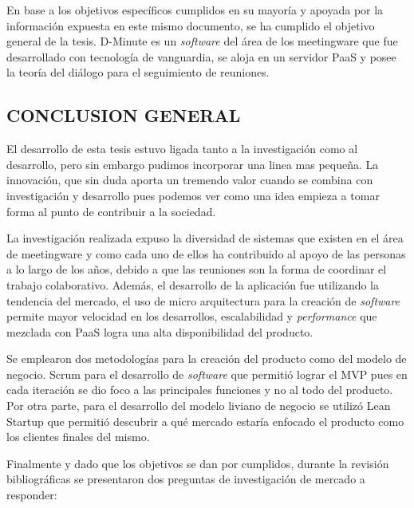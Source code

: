 En base a los objetivos específicos cumplidos en su mayoría y apoyada por la información expuesta en este mismo documento, se ha cumplido el objetivo general de la tesis. D-Minute es un \textit{software} del área de los meetingware que fue desarrollado con tecnología de vanguardia, se aloja en un servidor PaaS y posee la teoría del diálogo para el seguimiento de reuniones. 

\subsection{CONCLUSION GENERAL}

El desarrollo de esta tesis estuvo ligada tanto a la investigación como al desarrollo, pero sin embargo pudimos incorporar una linea mas pequeña. La innovación, que sin duda aporta un tremendo valor cuando se combina con investigación y desarrollo pues podemos ver como una idea empieza a tomar forma al punto de contribuir a la sociedad.

La investigación realizada expuso la diversidad de sistemas que existen en el área de meetingware y como cada uno de ellos ha contribuido al apoyo de las personas a lo largo de los años, debido a que las reuniones son la forma de coordinar el trabajo colaborativo. Además, el desarrollo de la aplicación fue utilizando la tendencia del mercado, el uso de micro arquitectura para la creación de \textit{software} permite mayor velocidad en los desarrollos, escalabilidad y \textit{performance} que mezclada con PaaS logra una alta disponibilidad del producto.

Se emplearon dos metodologías para la creación del producto como del modelo de negocio. Scrum para el desarrollo de \textit{software} que permitió lograr el MVP pues en cada iteración se dio foco a las principales funciones y no al todo del producto. Por otra parte, para el desarrollo del modelo liviano de negocio se utilizó Lean Startup que permitió descubrir a qué mercado estaría enfocado el producto como los clientes finales del mismo.

Finalmente y dado que los objetivos se dan por cumplidos, durante la revisión bibliográficas se presentaron dos preguntas de investigación de mercado a responder:

